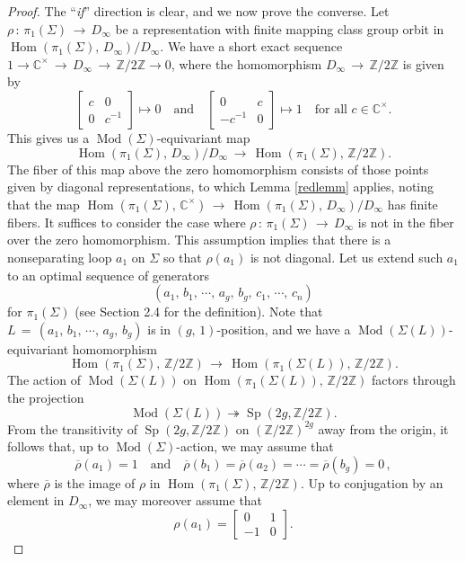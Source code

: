 \documentclass[reqno]{amsart}
\theoremstyle{plain}
\theoremstyle{definition}
\theoremstyle{remark}
\newcommand{\C}{{\mathbb{C}}}
\newcommand{\Z}{{\mathbb{Z}}}
\DeclareMathOperator{\Hom}{Hom}
\DeclareMathOperator{\Mod}{Mod}
\DeclareMathOperator{\Sp}{Sp}
\begin{document}
\begin{proof}
The ``\emph{if}'' direction is clear, and we now prove the converse. Let $\rho\,:\,\pi_1(\Sigma)\,\to\, D_\infty$
be a representation with finite mapping class group orbit in $\Hom(\pi_1(\Sigma),\,D_\infty)/D_\infty$. We have
a short exact sequence $1\to\C^\times\,\to\, D_\infty\,\to\, \Z/2\Z\to0$, where the
homomorphism $D_\infty\,\to\, \Z/2\Z$ is given by
$$\begin{bmatrix}c & 0\\ 0 & c^{-1}\end{bmatrix}\mapsto 0\quad\text{and}\quad \begin{bmatrix}0 & c\\ -c^{-1} & 0\end{bmatrix}\mapsto 1\quad\text{for all $c\in\C^\times$.}$$
This gives us a $\Mod(\Sigma)$-equivariant map
$$\Hom(\pi_1(\Sigma),\,D_\infty)/D_\infty\,\to\,\Hom(\pi_1(\Sigma),\,\Z/2\Z).$$ The fiber of this map above the
zero homomorphism consists of those points given by diagonal representations, to which Lemma \ref{redlemm}
applies, noting that the map $\Hom(\pi_1(\Sigma),\,\C^\times)\,\to\,\Hom(\pi_1(\Sigma),\,D_\infty)/D_\infty$ has finite
fibers. It suffices to consider the case where $\rho\,:\,\pi_1(\Sigma)\,\to\, D_\infty$ is not in the fiber over
the zero homomorphism. This assumption implies that there is a nonseparating loop $a_1$ on $\Sigma$ so
that $\rho(a_1)$ is not diagonal. Let us extend such $a_1$ to an optimal sequence of generators
$$(a_1,\,b_1,\,\cdots,\,a_g,\,b_g,\,c_1,\,\cdots,\,c_n)$$
for $\pi_1(\Sigma)$ (see Section 2.4 for the definition). Note that $L\,=\,(a_1,\,b_1,\,\cdots,\,a_g,\,b_g)$ is in
$(g,\,1)$-position, and we have a $\Mod(\Sigma(L))$-equivariant homomorphism
$$\Hom(\pi_1(\Sigma),\,\Z/2\Z)\,\to\,\Hom(\pi_1(\Sigma(L)),\,\Z/2\Z).$$
The action of $\Mod(\Sigma(L))$ on $\Hom(\pi_1(\Sigma(L)),\,\Z/2\Z)$ factors through the projection
$$\Mod(\Sigma(L))\twoheadrightarrow\Sp(2g,\Z/2\Z).$$ From the transitivity of $\Sp(2g,\Z/2\Z)$ on $(\Z/2\Z)^{2g}$ away from the origin, it follows that, up to $\Mod(\Sigma)$-action, we may assume that
$$\overline{\rho}(a_1)=1\quad\text{and}\quad\overline{\rho}(b_1)=\overline{\rho}(a_2)=
\cdots=\overline{\rho}(b_g)=0\, ,$$
where $\overline{\rho}$ is the image of $\rho$ in $\Hom(\pi_1(\Sigma),\,\Z/2\Z)$. Up to conjugation by an
element in $D_\infty$, we may moreover assume that
$$\rho(a_1)=\begin{bmatrix}0 & 1\\ -1 & 0\end{bmatrix}.$$

\end{proof}
\end{document}
